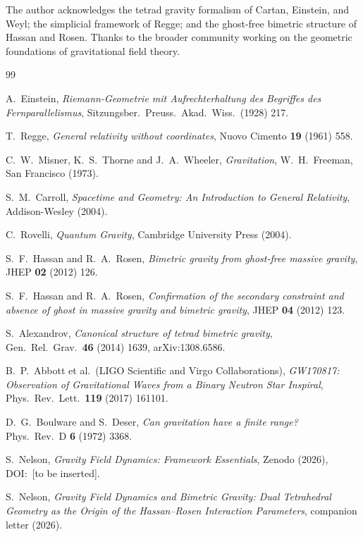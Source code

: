 \documentclass[a4paper,11pt]{article}
\begin{document}
The author acknowledges the tetrad gravity formalism of
Cartan, Einstein, and Weyl; the simplicial framework of
Regge; and the ghost-free bimetric structure of Hassan
and Rosen. Thanks to the broader community working on
the geometric foundations of gravitational field theory.


\begin{thebibliography}{99}

A.~Einstein,
\emph{Riemann-Geometrie mit Aufrechterhaltung des Begriffes
des Fernparallelismus},
Sitzungsber.\ Preuss.\ Akad.\ Wiss.\ (1928) 217.

T.~Regge,
\emph{General relativity without coordinates},
Nuovo Cimento \textbf{19} (1961) 558.

C.~W.~Misner, K.~S.~Thorne and J.~A.~Wheeler,
\emph{Gravitation},
W.~H.~Freeman, San Francisco (1973).

S.~M.~Carroll,
\emph{Spacetime and Geometry: An Introduction to General
Relativity},
Addison-Wesley (2004).

C.~Rovelli,
\emph{Quantum Gravity},
Cambridge University Press (2004).

S.~F.~Hassan and R.~A.~Rosen,
\emph{Bimetric gravity from ghost-free massive gravity},
JHEP \textbf{02} (2012) 126.

S.~F.~Hassan and R.~A.~Rosen,
\emph{Confirmation of the secondary constraint and absence of
ghost in massive gravity and bimetric gravity},
JHEP \textbf{04} (2012) 123.

S.~Alexandrov,
\emph{Canonical structure of tetrad bimetric gravity},
Gen.\ Rel.\ Grav.\ \textbf{46} (2014) 1639,
arXiv:1308.6586.

B.~P.~Abbott et al.\ (LIGO Scientific and Virgo
Collaborations),
\emph{GW170817: Observation of Gravitational Waves from a
Binary Neutron Star Inspiral},
Phys.\ Rev.\ Lett.\ \textbf{119} (2017) 161101.

D.~G.~Boulware and S.~Deser,
\emph{Can gravitation have a finite range?}
Phys.\ Rev.\ D \textbf{6} (1972) 3368.

S.~Nelson,
\emph{Gravity Field Dynamics: Framework Essentials},
Zenodo (2026), DOI:~[to be inserted].

S.~Nelson,
\emph{Gravity Field Dynamics and Bimetric Gravity: Dual
Tetrahedral Geometry as the Origin of the Hassan--Rosen
Interaction Parameters},
companion letter (2026).

\end{thebibliography}
\end{document}
